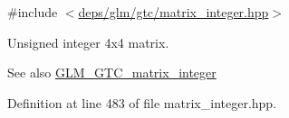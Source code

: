 {\ttfamily \#include $<$\hyperlink{matrix__integer_8hpp}{deps/glm/gtc/matrix\+\_\+integer.\+hpp}$>$}

Unsigned integer 4x4 matrix. \begin{DoxySeeAlso}{See also}
\hyperlink{group__gtc__matrix__integer}{G\+L\+M\+\_\+\+G\+T\+C\+\_\+matrix\+\_\+integer} 
\end{DoxySeeAlso}


Definition at line 483 of file matrix\+\_\+integer.\+hpp.

